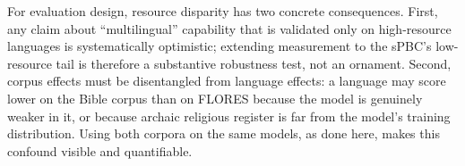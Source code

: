 For evaluation design, resource disparity has two concrete consequences.
First, any claim about ``multilingual'' capability that is validated only
on high-resource languages is systematically optimistic; extending
measurement to the sPBC's low-resource tail is therefore a substantive
robustness test, not an ornament. Second, corpus effects must be
disentangled from language effects: a language may score lower on the
Bible corpus than on FLORES because the model is genuinely weaker in it,
or because archaic religious register is far from the model's training
distribution. Using both corpora on the same models, as done here, makes
this confound visible and quantifiable.


